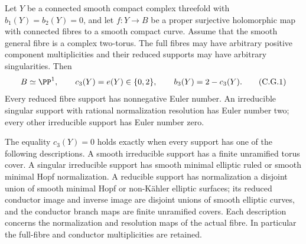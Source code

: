 \begin{theorem}
\label{cdp:st:C.2.G.1}
Let $Y$ be a connected smooth compact complex threefold with
$b_1(Y)=b_2(Y)=0$, and let $f:Y\to B$ be a proper surjective
holomorphic map with connected fibres to a smooth compact curve.
Assume that the smooth general fibre is a complex two-torus.
The full fibres may have arbitrary positive component multiplicities
and their reduced supports may have arbitrary singularities. Then
\[
 B\simeq\PP^1,\qquad
 c_3(Y)=e(Y)\in\{0,2\},\qquad b_3(Y)=2-c_3(Y).
 \tag{C.G.1}\label{cdp:eq:C.G.1}
\]
Every reduced fibre support has nonnegative Euler number.
An irreducible singular support with rational normalization
resolution has Euler number two; every other irreducible support
has Euler number zero.

The equality $c_3(Y)=0$ holds exactly when every support has one
of the following descriptions. A smooth irreducible support has
a finite unramified torus cover. A singular irreducible support
has smooth minimal elliptic ruled or smooth minimal Hopf
normalization. A reducible support has normalization a disjoint
union of smooth minimal Hopf or non-K\"ahler elliptic surfaces;
its reduced conductor image and inverse image are disjoint
unions of smooth elliptic curves, and the conductor branch maps
are finite unramified covers. Each description concerns the
normalization and resolution maps of the actual fibre. In
particular the full-fibre and conductor multiplicities are
retained.
\end{theorem}

